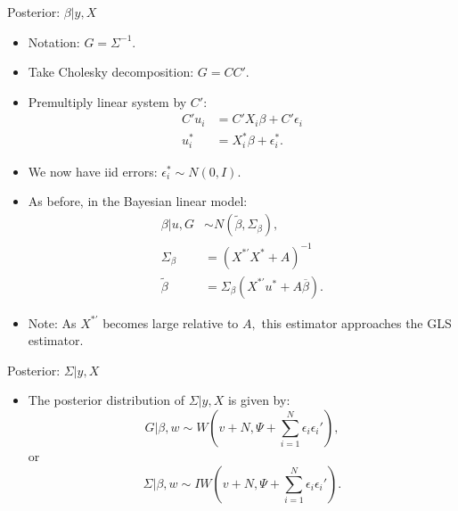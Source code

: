 \documentclass[aspectratio=169]{beamer}
\begin{document}
%
\begin{frame}{Posterior: $\beta|y,X$}
\begin{itemize}
\item Notation: $G=\Sigma^{-1}.$
\item Take Cholesky decomposition: $G=CC'.$
\item Premultiply linear system by $C':$ 
\begin{align*}
C'u_{i} & =C'X_{i}\beta+C'\epsilon_{i}\\
u_{i}^{*} & =X_{i}^{*}\beta+\epsilon_{i}^{*}.
\end{align*}
\item We now have iid errors: $\epsilon_{i}^{*}\sim N(0,I).$
\item As before, in the Bayesian linear model: 
\begin{align*}
\beta|u,G & \sim N(\tilde{\beta},\Sigma_{\beta}),\\
\Sigma_{\beta} & =(X^{*'}X^{*}+A)^{-1}\\
\tilde{\beta} & =\Sigma_{\beta}(X^{*'}u^{*}+A\overline{\beta}).
\end{align*}
\item Note: As $X^{*'}$ becomes large relative to $A,$ this estimator
approaches the GLS estimator.
\end{itemize}
\end{frame}
%
\begin{frame}{Posterior: $\Sigma|y,X$}
\begin{itemize}
\item The posterior distribution of $\Sigma|y,X$ is given by:
\[
G|\beta,w\sim W(v+N,\Psi+\sum_{i=1}^{N}\epsilon_{i}\epsilon_{i}'),
\]
 or 
\[
\Sigma|\beta,w\sim IW(v+N,\Psi+\sum_{i=1}^{N}\epsilon_{i}\epsilon_{i}').
\]
\end{itemize}
\end{frame}
%
\end{document}
